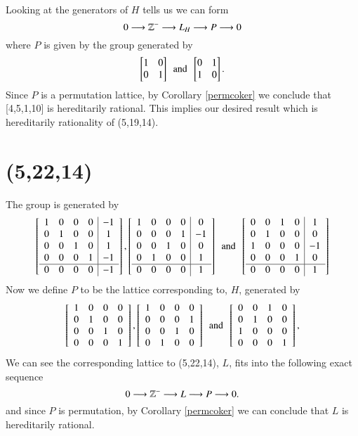 Looking at the generators of $H$ tells us we can form 
$$0 \longrightarrow \mathbb{Z}^- \longrightarrow L_H \longrightarrow P \longrightarrow 0$$ 
where $P$ is given by the group generated by
$$
\begin{bmatrix}
1&0\\
0& 1
\end{bmatrix}
\,\,\, \text{and} \,\,\,
\begin{bmatrix}
0&1\\
1&0
\end{bmatrix}
.$$
Since $P$ is a permutation lattice, by Corollary \ref{permcoker} we conclude 
that [4,5,1,10] is hereditarily rational. This implies our desired result 
which is hereditarily rationality of (5,19,14). 


 \section{(5,22,14)}
The group is generated by 
$$
  \left[ \begin {array}{cccc|c} 1&0&0&0&-1\\0&1&0&0&1
\\0&0&1&0&1\\0&0&0&1&-1
\\ \hline 0&0&0&0&-1\end {array} \right] ,
 \left[ \begin {array}{cccc|c} 1&0&0&0&0\\0&0&0&1&-1
\\0&0&1&0&0\\0&1&0&0&1
\\ \hline 0&0&0&0&1\end {array} \right] 
\,\,\, \text{and} \,\,\,
 \left[ \begin {array}{cccc|c} 0&0&1&0&1\\0&1&0&0&0
\\1&0&0&0&-1\\0&0&0&1&0
\\ \hline 0&0&0&0&1\end {array} \right] 
$$
Now we define $P$ to be the lattice corresponding to, $H$, generated by 
$$
  \left[ \begin {array}{cccc} 1&0&0&0\\0&1&0&0
\\0&0&1&0\\0&0&0&1
\end {array} \right] ,
 \left[ \begin {array}{cccc} 1&0&0&0\\0&0&0&1
\\0&0&1&0\\0&1&0&0
\end {array} \right] 
\,\,\, \text{and} \,\,\,
 \left[ \begin {array}{cccc} 0&0&1&0\\0&1&0&0
\\1&0&0&0\\0&0&0&1
\end {array} \right],
$$
We can see the corresponding lattice to (5,22,14), $L$, fits into the following exact sequence
$$0\longrightarrow \mathbb{Z}^- \longrightarrow L \longrightarrow P \longrightarrow 0.$$
and since $P$ is permutation, by Corollary \ref{permcoker} we can conclude that $L$ is hereditarily rational.
